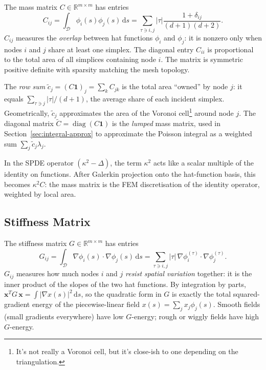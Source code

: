 \documentclass[11pt]{article}
\DeclareMathOperator{\diag}{diag}
\newcommand{\R}{\mathbb{R}}
\newcommand{\dd}{\,\mathrm{d}}
\begin{document}
The mass matrix $C \in \R^{m\times m}$ has entries
\begin{equation}
  C_{ij} = \int_\mathcal{D} \phi_i(s)\phi_j(s) \dd s
         = \sum_{\tau \ni i,j} |\tau| \frac{1 + \delta_{ij}}{(d+1)(d+2)}.
  \label{eq:mass}
\end{equation}
$C_{ij}$ measures the \emph{overlap} between hat functions $\phi_i$ and
$\phi_j$: it is nonzero only when nodes $i$ and $j$ share at least one
simplex.  The diagonal entry $C_{ii}$ is proportional to the total area of
all simplices containing node $i$.  The matrix is symmetric positive definite
with sparsity matching the mesh topology.

The \emph{row sum} $\tilde{c}_j = (C\mathbf{1})_j = \sum_k C_{jk}$ is the
total area ``owned'' by node $j$: it equals $\sum_{\tau\ni j}|\tau|/(d+1)$,
the average share of each incident simplex.  Geometrically, $\tilde{c}_j$
approximates the area of the Voronoi cell\footnote{It's not really a Voronoi cell, but it's close-ish to one depending on the triangulation.} around node $j$.  The diagonal
matrix $\tilde{C} = \diag(C\mathbf{1})$ is the \emph{lumped} mass matrix,
used in Section~\ref{sec:integral-approx} to approximate the Poisson integral
as a weighted sum $\sum_j \tilde{c}_j \lambda_j$.

In the SPDE operator $(\kappa^2 - \Delta)$, the term $\kappa^2$ acts like a
scalar multiple of the identity on functions.  After Galerkin projection onto
the hat-function basis, this becomes $\kappa^2 C$: the mass matrix is the
FEM discretisation of the identity operator, weighted by local area.

\subsection{Stiffness Matrix}
\label{sec:stiffness}

The stiffness matrix $G \in \R^{m\times m}$ has entries
\begin{equation}
  G_{ij} = \int_\mathcal{D} \nabla\phi_i(s) \cdot \nabla\phi_j(s) \dd s
         = \sum_{\tau \ni i,j} |\tau| \, \nabla\phi_i^{(\tau)} \cdot \nabla\phi_j^{(\tau)}.
  \label{eq:stiff}
\end{equation}
$G_{ij}$ measures how much nodes $i$ and $j$ \emph{resist spatial variation}
together: it is the inner product of the slopes of the two hat functions.
By integration by parts, $\mathbf{x}^T G\, \mathbf{x} =
\int|\nabla x(s)|^2\dd s$, so the quadratic form in $G$ is exactly the total
squared-gradient energy of the piecewise-linear field
$x(s)=\sum_j x_j\phi_j(s)$.  Smooth fields (small gradients everywhere) have
low $G$-energy; rough or wiggly fields have high $G$-energy.
\end{document}
